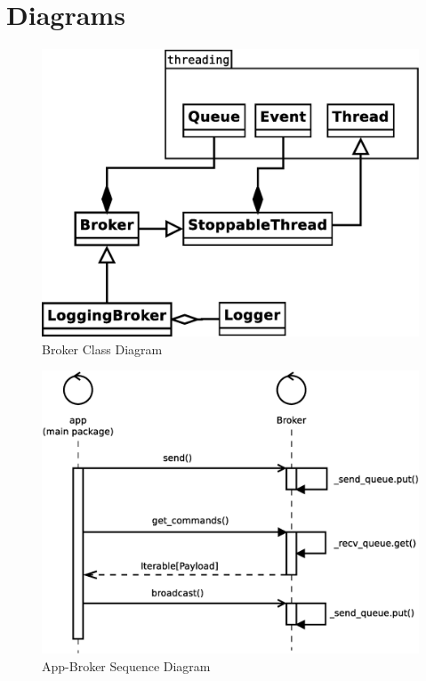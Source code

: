 \documentclass{article}
\begin{document}
\section{Diagrams}
\begin{figure}[H]
	\centering
	\includegraphics[width=\linewidth]{../diagrams/BrokerDiagram.eps}
	\caption{Broker Class Diagram}
\end{figure}

\begin{figure}[H]
	\centering
	\includegraphics[width=\linewidth]{../diagrams/AppBrokerSequenceDiagram.eps}
	\caption{App-Broker Sequence Diagram}
\end{figure}

\newpage
\end{document}
